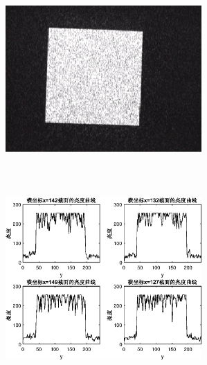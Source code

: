 \documentclass[UTF8]{ctexart}
\makeatletter
\newcommand{\figcaption}{\def\@captype{figure}\caption}
\makeatother
\begin{document}
\begin{center}
			\includegraphics[width=7.5cm,height=7.5cm]{YUANaddDOEmoveCCD27.eps}
			\includegraphics[width=7.5cm,height=7.5cm]{addDOEmoveCCD27.eps}
			\figcaption{加DOE的CCD捕捉图和光亮度曲线(CCD与DOE距离27cm)}\label{addDOEmoveCCD27}
			

\end{center}
\end{document}
